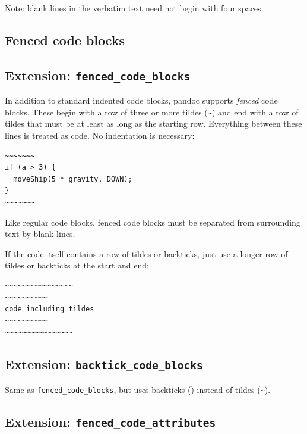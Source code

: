 \documentclass[
  b5paper
]{book}
\begin{document}
Note: blank lines in the verbatim text need not begin with four spaces.

\subsection{Fenced code blocks}\label{fenced-code-blocks}

\subsection{\texorpdfstring{Extension:
\texttt{fenced\_code\_blocks}}{Extension: fenced\_code\_blocks}}\label{extension-fenced_code_blocks}

In addition to standard indented code blocks, pandoc supports
\emph{fenced} code blocks. These begin with a row of three or more
tildes (\texttt{\textasciitilde{}}) and end with a row of tildes that
must be at least as long as the starting row. Everything between these
lines is treated as code. No indentation is necessary:

\begin{verbatim}
~~~~~~~
if (a > 3) {
  moveShip(5 * gravity, DOWN);
}
~~~~~~~
\end{verbatim}

Like regular code blocks, fenced code blocks must be separated from
surrounding text by blank lines.

If the code itself contains a row of tildes or backticks, just use a
longer row of tildes or backticks at the start and end:

\begin{verbatim}
~~~~~~~~~~~~~~~~
~~~~~~~~~~
code including tildes
~~~~~~~~~~
~~~~~~~~~~~~~~~~
\end{verbatim}

\subsection{\texorpdfstring{Extension:
\texttt{backtick\_code\_blocks}}{Extension: backtick\_code\_blocks}}\label{extension-backtick_code_blocks}

Same as \texttt{fenced\_code\_blocks}, but uses backticks
(\texttt{\textasciigrave{}}) instead of tildes
(\texttt{\textasciitilde{}}).

\subsection{\texorpdfstring{Extension:
\texttt{fenced\_code\_attributes}}{Extension: fenced\_code\_attributes}}\label{extension-fenced_code_attributes}
\end{document}
